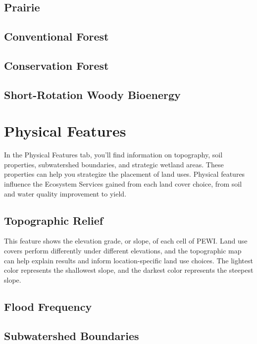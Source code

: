 \documentclass[11pt]{article}
\begin{document}
\subsection{Prairie}

\subsection{Conventional Forest}

\subsection{Conservation Forest}

\subsection{Short-Rotation Woody Bioenergy}

\newpage
\section{Physical Features}\label{sec:physicalfeatures}
In the Physical Features tab, you'll find information on topography, soil properties, subwatershed boundaries, and strategic wetland areas. These properties can help you strategize the placement of land uses. Physical features influence the Ecosystem Services gained from each land cover choice, from soil and water quality improvement to yield.

\subsection{Topographic Relief}
This feature shows the elevation grade, or slope, of each cell of PEWI. Land use covers perform differently under different elevations, and the topographic map can help explain results and inform location-specific land use choices. The lightest color represents the shallowest slope, and the darkest color represents the steepest slope.

\subsection{Flood Frequency}

\subsection{Subwatershed Boundaries}
\end{document}
